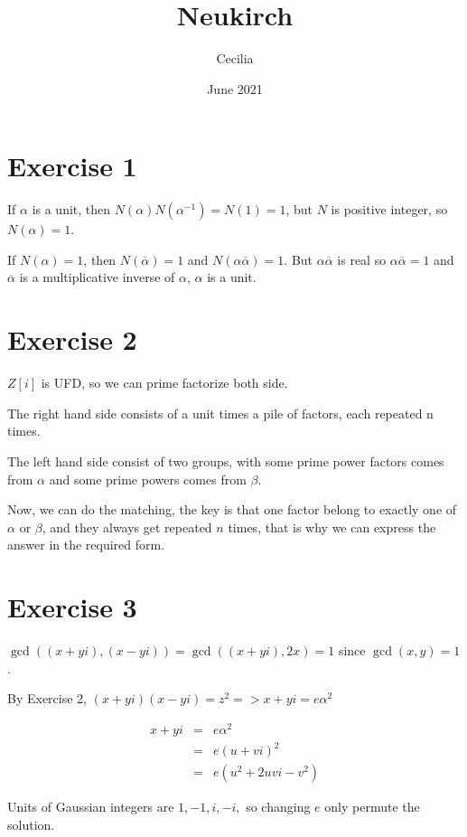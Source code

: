 \documentclass{article}
\title{Neukirch}
\author{Cecilia}
\date{June 2021}
\begin{document}
\maketitle

\section*{Exercise 1}
If $ \alpha $ is a unit, then $ N(\alpha) N(\alpha^{-1}) = N(1) = 1 $, but $ N $ is positive integer, so $ N(\alpha) = 1 $.

If $ N(\alpha) = 1 $, then $ N(\overline{\alpha}) = 1 $ and $ N(\alpha \overline{\alpha}) = 1 $. But $ \alpha \overline{\alpha}$ is real so $ \alpha \overline{\alpha} = 1 $ and $ \overline{\alpha} $ is a multiplicative inverse of $ \alpha $, $ \alpha $ is a unit.

\section*{Exercise 2}
$ Z[i] $ is UFD, so we can prime factorize both side.

The right hand side consists of a unit times a pile of factors, each repeated n times.

The left hand side consist of two groups, with some prime power factors comes from $ \alpha $ and some prime powers comes from $ \beta $.

Now, we can do the matching, the key is that one factor belong to exactly one of $ \alpha $ or $ \beta $, and they always get repeated $ n $ times, that is why we can express the answer in the required form.

\section*{Exercise 3}

$ \gcd((x + yi), (x - yi)) = \gcd((x + yi), 2x) = 1 $ since $ \gcd(x, y) = 1 $.

By Exercise 2, $ (x + yi)(x - yi) = z^2 => x + yi = e \alpha^2 $

\begin{eqnarray*}
  x + yi &=& e \alpha^2   \\
         &=& e (u + vi)^2 \\
         &=& e (u^2 + 2uvi -v^2)
\end{eqnarray*}

Units of Gaussian integers are $ 1, -1, i, -i, $ so changing $ e $ only permute the solution.
\end{document}
